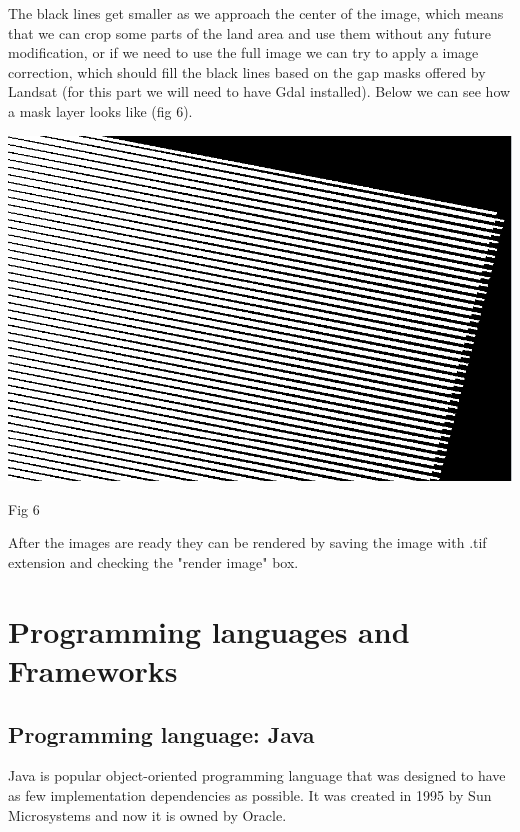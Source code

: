 \documentclass[12pt, a4paper]{report}
\begin{document}
\quad
The black lines get smaller as we approach the center of the image, which means that we can crop some parts of the land area and use them without any future modification, or if we need to use the full image we can try to apply a image correction, which should fill the black lines based on the gap masks offered by Landsat (for this part we will need to have Gdal installed). Below we can see how a mask layer looks like (fig 6).
\par 


\bigskip

\includegraphics[scale=0.54, center]{landsat_black_stripes_correction.png} 
\begin{center}
Fig 6
\end{center}
\par 

After the images are ready they can be rendered by saving the image with .tif extension and checking the "render image" box.



\section{Programming languages and Frameworks} 

\subsection{Programming language: Java}
\medskip

\quad
Java is popular object-oriented programming language that was designed to have as few implementation dependencies as possible. It was created in 1995 by Sun Microsystems and now it is owned by Oracle.
\par
\end{document}
